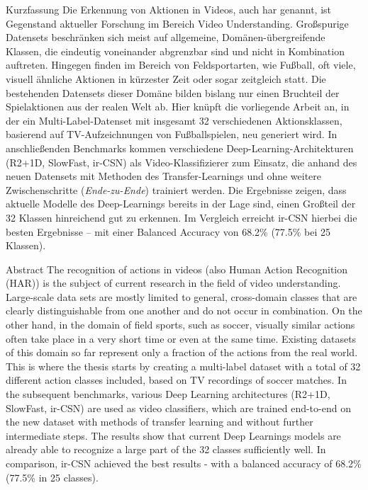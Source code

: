 \newcommand{\primarymetric}{68.2}
\newcommand{\secondarymetric}{77.5}

\begin{prefacesection}{Kurzfassung}
    Die Erkennung von Aktionen in Videos, auch \gls{har} genannt, ist Gegenstand aktueller Forschung im Bereich Video Understanding.
    Großspurige Datensets beschränken sich meist auf allgemeine, Domänen-übergreifende Klassen, die eindeutig voneinander abgrenzbar sind und nicht in Kombination auftreten.
    Hingegen finden im Bereich von Feldsportarten, wie Fußball, oft viele, visuell ähnliche Aktionen in kürzester Zeit oder sogar zeitgleich statt.
    Die bestehenden Datensets dieser Domäne bilden bislang nur einen Bruchteil der Spielaktionen aus der realen Welt ab.
    Hier knüpft die vorliegende Arbeit an, in der ein Multi-Label-Datenset mit insgesamt 32 verschiedenen Aktionsklassen, basierend auf TV-Aufzeichnungen von Fußballspielen, neu generiert wird.
    In anschließenden Benchmarks kommen verschiedene Deep-Learning-Architekturen (R2+1D, SlowFast, ir-CSN) als Video-Klassifizierer zum Einsatz, die anhand des neuen Datensets mit Methoden des Transfer-Learnings und ohne weitere Zwischenschritte (\emph{Ende-zu-Ende}) trainiert werden.
    Die Ergebnisse zeigen, dass aktuelle Modelle des Deep-Learnings bereits in der Lage sind, einen Großteil der 32 Klassen hinreichend gut zu erkennen.
    Im Vergleich erreicht ir-CSN hierbei die besten Ergebnisse -- mit einer Balanced Accuracy von \primarymetric \% (\secondarymetric \% bei 25 Klassen).
\end{prefacesection}

\vfill

\begin{prefacesection}{Abstract}
    The recognition of actions in videos (also Human Action Recognition (HAR)) is the subject of current research in the field of video understanding.
    Large-scale data sets are mostly limited to general, cross-domain classes that are clearly distinguishable from one another and do not occur in combination.
    On the other hand, in the domain of field sports, such as soccer, visually similar actions often take place in a very short time or even at the same time.
    Existing datasets of this domain so far represent only a fraction of the actions from the real world.
    This is where the thesis starts by creating a multi-label dataset with a total of 32 different action classes included, based on TV recordings of soccer matches.
    In the subsequent benchmarks, various Deep Learning architectures (R2+1D, SlowFast, ir-CSN) are used as video classifiers, which are trained end-to-end on the new dataset with methods of transfer learning and without further intermediate steps.
    The results show that current Deep Learnings models are already able to recognize a large part of the 32 classes sufficiently well.
    In comparison, ir-CSN achieved the best results - with a balanced accuracy of \primarymetric \% (\secondarymetric \% in 25 classes).

\end{prefacesection}